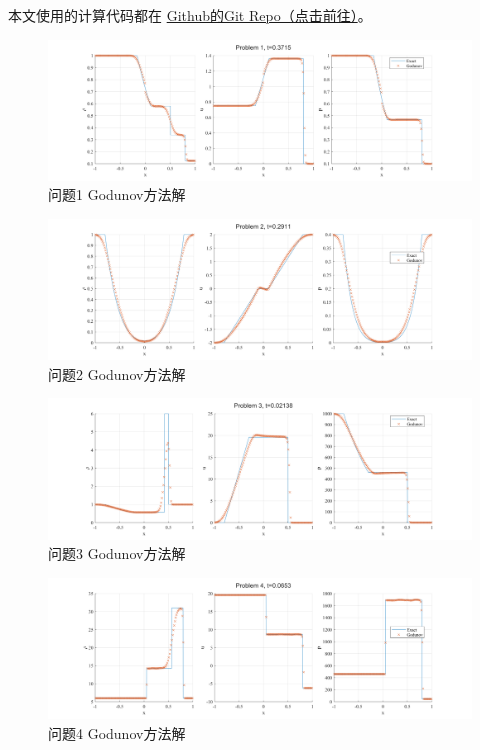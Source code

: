 \documentclass[UTF8,zihao=5]{ctexart} %
\begin{document}
本文使用的计算代码都在
\href{https://github.com/harryzhou2000/HW_ACFD}{Github的Git Repo（点击前往）}。

\begin{figure}[H]
    \centering
    \includegraphics[width=18cm]{p1_gn.png}  %
    \caption{问题1 Godunov方法解}
    \label{fig:1c}
\end{figure}

\begin{figure}[H]
    \centering
    \includegraphics[width=18cm]{p2_gn.png}  %
    \caption{问题2 Godunov方法解}
    \label{fig:2c}
\end{figure}

\begin{figure}[H]
    \centering
    \includegraphics[width=18cm]{p3_gn.png}  %
    \caption{问题3 Godunov方法解}
    \label{fig:3c}
\end{figure}

\begin{figure}[H]
    \centering
    \includegraphics[width=18cm]{p4_gn.png}  %
    \caption{问题4 Godunov方法解}
    \label{fig:4c}
\end{figure}
\end{document}
